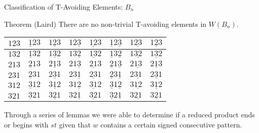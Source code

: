 \documentclass{beamer}
\begin{document}
\begin{frame}{Classification of T-Avoiding Elements: $B_n$}

\begin{block}{Theorem (Laird)}
	There are no non-trivial T-avoiding elements in $W(B_n)$.
\end{block}

\pause

\begin{center}
\begin{tabular}{|l|l|l|l|l|l|l|l|}
\hline
\cellcolor{blue!30}$123$ & \cellcolor{orange2!40}$\underline{1}23$ & \cellcolor{brown!50}$1\underline{2}3$ & \cellcolor{red!25}$12\underline{3}$ & \cellcolor{brown!50}$\underline{12}3$ & \cellcolor{red!25}$\underline{1}2\underline{3}$ & \cellcolor{turq!40}$1\underline{23}$ & \cellcolor{turq!40}$\underline{123}$ \\
\hline
\cellcolor{blue!30}$132$ & \cellcolor{orange2!40}$\underline{1}32$ & \cellcolor{brown!50}$1\underline{3}2$ & \cellcolor{red!25}$13\underline{2}$ & \cellcolor{brown!50}$\underline{13}2$ & \cellcolor{red!25}$\underline{1}3\underline{2}$ & \cellcolor{ggreen!50}$1\underline{32}$ & \cellcolor{ggreen!50}$\underline{132}$ \\
\hline
\cellcolor{blue!30}$213$ & \cellcolor{yellow!50}$\underline{2}13$ & \cellcolor{brown!50}$2\underline{1}3$ & \cellcolor{turq!40}$21\underline{3}$ & \cellcolor{yellow!50}$\underline{21}3$ & \cellcolor{red!25}$\underline{2}1\underline{3}$ & \cellcolor{turq!40}$2\underline{13}$ & \cellcolor{red!25}$\underline{213}$ \\
\hline
\cellcolor{red!25}$231$ & \cellcolor{purple2!50}$\underline{2}31$ & \cellcolor{ggreen!50}$2\underline{3}1$ & \cellcolor{red!25}$23\underline{1}$ & \cellcolor{brown!50}$\underline{23}1$ & \cellcolor{purple2!50}$\underline{2}3\underline{1}$ & \cellcolor{ggreen!50}$2\underline{31}$ & \cellcolor{brown!50}$\underline{231}$ \\
\hline
\cellcolor{ggreen!50}$312$ & \cellcolor{yellow!50}$\underline{3}12$ & \cellcolor{ggreen!50}$3\underline{1}2$ &\cellcolor{turq!40}$31\underline{2}$ & \cellcolor{yellow!50}$\underline{31}2$ & \cellcolor{yellow!50}$\underline{3}1\underline{2}$ & \cellcolor{turq!40}$3\underline{12}$ & \cellcolor{yellow!50}$\underline{312}$ \\
\hline
\cellcolor{turq!40}$321$ & \cellcolor{yellow!50}$\underline{3}21$ & \cellcolor{ggreen!50}$3\underline{2}1$ & \cellcolor{turq!40}$32\underline{1}$ & \cellcolor{yellow!50}$\underline{32}1$ & \cellcolor{yellow!50}$\underline{3}2\underline{1}$ & \cellcolor{ggreen!50}$3\underline{21}$ & \cellcolor{yellow!50}$\underline{321}$\\
\hline
\end{tabular}
\end{center}

Through a series of lemmas we were able to determine if a reduced product ends or begins with $st$ given that $w$ contains a certain signed consecutive pattern.

\end{frame}
\end{document}
